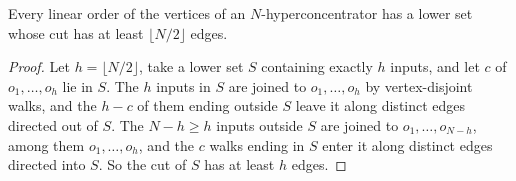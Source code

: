 \begin{lemma}
  \label{lem:lowerbounds-algebraic-hyperconcentrator-cut}
  \leanok
  Every linear order of the vertices of an $N$-hyperconcentrator has a lower set whose cut has
  at least $\lfloor N/2\rfloor$ edges.
\end{lemma}
\begin{proof}
  \leanok
  Let $h=\lfloor N/2\rfloor$, take a lower set $S$ containing exactly $h$ inputs, and let $c$ of
  $o_1,\dots,o_h$ lie in $S$. The $h$ inputs in $S$ are joined to $o_1,\dots,o_h$ by
  vertex-disjoint walks, and the $h-c$ of them ending outside $S$ leave it along distinct edges
  directed out of $S$. The $N-h\ge h$ inputs outside $S$ are joined to $o_1,\dots,o_{N-h}$, among
  them $o_1,\dots,o_h$, and the $c$ walks ending in $S$ enter it along distinct edges directed
  into $S$. So the cut of $S$ has at least $h$ edges.
\end{proof}

